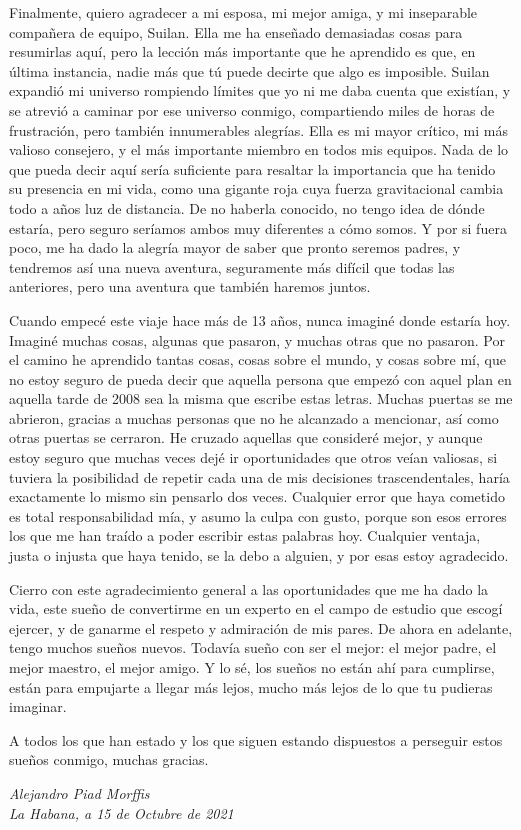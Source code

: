 Finalmente, quiero agradecer a mi esposa, mi mejor amiga, y mi inseparable compañera de equipo, Suilan.
Ella me ha enseñado demasiadas cosas para resumirlas aquí, pero la lección más importante que he aprendido es que, en última instancia, nadie más que tú puede decirte que algo es imposible.
Suilan expandió mi universo rompiendo límites que yo ni me daba cuenta que existían, y se atrevió a caminar por ese universo conmigo, compartiendo miles de horas de frustración, pero también innumerables alegrías.
Ella es mi mayor crítico, mi más valioso consejero, y el más importante miembro en todos mis equipos.
Nada de lo que pueda decir aquí sería suficiente para resaltar la importancia que ha tenido su presencia en mi vida, como una gigante roja cuya fuerza gravitacional cambia todo a años luz de distancia.
De no haberla conocido, no tengo idea de dónde estaría, pero seguro seríamos ambos muy diferentes a cómo somos.
Y por si fuera poco, me ha dado la alegría mayor de saber que pronto seremos padres, y tendremos así una nueva aventura, seguramente más difícil que todas las anteriores, pero una aventura que también haremos juntos.

Cuando empecé este viaje hace más de 13 años, nunca imaginé donde estaría hoy.
Imaginé muchas cosas, algunas que pasaron, y muchas otras que no pasaron.
Por el camino he aprendido tantas cosas, cosas sobre el mundo, y cosas sobre mí, que no estoy seguro de pueda decir que aquella persona que empezó con aquel plan en aquella tarde de 2008 sea la misma que escribe estas letras.
Muchas puertas se me abrieron, gracias a muchas personas que no he alcanzado a mencionar, así como otras puertas se cerraron.
He cruzado aquellas que consideré mejor, y aunque estoy seguro que muchas veces dejé ir oportunidades que otros veían valiosas, si tuviera la posibilidad de repetir cada una de mis decisiones trascendentales, haría exactamente lo mismo sin pensarlo dos veces.
Cualquier error que haya cometido es total responsabilidad mía, y asumo la culpa con gusto, porque son esos errores los que me han traído a poder escribir estas palabras hoy.
Cualquier ventaja, justa o injusta que haya tenido, se la debo a alguien, y por esas estoy agradecido.

Cierro con este agradecimiento general a las oportunidades que me ha dado la vida, este sueño de convertirme en un experto en el campo de estudio que escogí ejercer, y de ganarme el respeto y admiración de mis pares.
De ahora en adelante, tengo muchos sueños nuevos.
Todavía sueño con ser el mejor: el mejor padre, el mejor maestro, el mejor amigo.
Y lo sé, los sueños no están ahí para cumplirse, están para empujarte a llegar más lejos, mucho más lejos de lo que tu pudieras imaginar.

A todos los que han estado y los que siguen estando dispuestos a perseguir estos sueños conmigo, muchas gracias.

\vfill
\begin{flushright}
{\it Alejandro Piad Morffis}\\
{\it La Habana, a 15 de Octubre de 2021}
\end{flushright}
